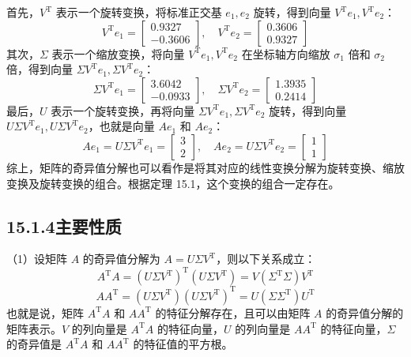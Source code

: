 \documentclass[UTF8, 12pt, fontset=fandol, oneside]{ctexart}
\begin{document}
首先，$V^{\mathrm{T}}$ 表示一个旋转变换，将标准正交基 $e_1,e_2$ 旋转，得到向量 $V^{\mathrm{T}}e_1,V^{\mathrm{T}}e_2$：
\[
V^{\mathrm{T}}e_1=\begin{bmatrix}0.9327\\-0.3606\end{bmatrix},\quad
V^{\mathrm{T}}e_2=\begin{bmatrix}0.3606\\0.9327\end{bmatrix}
\]
其次，$\Sigma$ 表示一个缩放变换，将向量 $V^{\mathrm{T}}e_1,V^{\mathrm{T}}e_2$ 在坐标轴方向缩放 $\sigma_1$ 倍和 $\sigma_2$ 倍，得到向量 $\Sigma V^{\mathrm{T}}e_1,\Sigma V^{\mathrm{T}}e_2$：
\[
\Sigma V^{\mathrm{T}}e_1=\begin{bmatrix}3.6042\\-0.0933\end{bmatrix},\quad
\Sigma V^{\mathrm{T}}e_2=\begin{bmatrix}1.3935\\0.2414\end{bmatrix}
\]
最后，$U$ 表示一个旋转变换，再将向量 $\Sigma V^{\mathrm{T}}e_1,\Sigma V^{\mathrm{T}}e_2$ 旋转，得到向量 $U\Sigma V^{\mathrm{T}}e_1,U\Sigma V^{\mathrm{T}}e_2$，也就是向量 $Ae_1$ 和 $Ae_2$：
\[
Ae_1=U\Sigma V^{\mathrm{T}}e_1=\begin{bmatrix}3\\2\end{bmatrix},\quad
Ae_2=U\Sigma V^{\mathrm{T}}e_2=\begin{bmatrix}1\\1\end{bmatrix}
\]
综上，矩阵的奇异值分解也可以看作是将其对应的线性变换分解为旋转变换、缩放变换及旋转变换的组合。根据定理 15.1，这个变换的组合一定存在。

\subsection*{15.1.4\quad 主要性质}

（1）设矩阵 $A$ 的奇异值分解为 $A=U\Sigma V^{\mathrm{T}}$，则以下关系成立：
\begin{equation}
A^{\mathrm{T}}A=(U\Sigma V^{\mathrm{T}})^{\mathrm{T}}(U\Sigma V^{\mathrm{T}})
=V(\Sigma^{\mathrm{T}}\Sigma)V^{\mathrm{T}}
\tag{15.20}
\end{equation}
\begin{equation}
AA^{\mathrm{T}}=(U\Sigma V^{\mathrm{T}})(U\Sigma V^{\mathrm{T}})^{\mathrm{T}}
=U(\Sigma\Sigma^{\mathrm{T}})U^{\mathrm{T}}
\tag{15.21}
\end{equation}
也就是说，矩阵 $A^{\mathrm{T}}A$ 和 $AA^{\mathrm{T}}$ 的特征分解存在，且可以由矩阵 $A$ 的奇异值分解的矩阵表示。$V$ 的列向量是 $A^{\mathrm{T}}A$ 的特征向量，$U$ 的列向量是 $AA^{\mathrm{T}}$ 的特征向量，$\Sigma$ 的奇异值是 $A^{\mathrm{T}}A$ 和 $AA^{\mathrm{T}}$ 的特征值的平方根。
\end{document}
